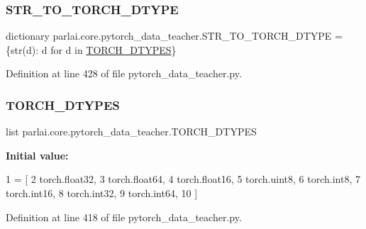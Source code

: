 \subsubsection{\texorpdfstring{S\+T\+R\+\_\+\+T\+O\+\_\+\+T\+O\+R\+C\+H\+\_\+\+D\+T\+Y\+PE}{STR\_TO\_TORCH\_DTYPE}}
{\footnotesize\ttfamily dictionary parlai.\+core.\+pytorch\+\_\+data\+\_\+teacher.\+S\+T\+R\+\_\+\+T\+O\+\_\+\+T\+O\+R\+C\+H\+\_\+\+D\+T\+Y\+PE = \{str(d)\+: d for d in \hyperlink{namespaceparlai_1_1core_1_1pytorch__data__teacher_a70d3594b63522c1d2596bd15f1fb89e0}{T\+O\+R\+C\+H\+\_\+\+D\+T\+Y\+P\+ES}\}}



Definition at line 428 of file pytorch\+\_\+data\+\_\+teacher.\+py.

\mbox{\label{namespaceparlai_1_1core_1_1pytorch__data__teacher_a70d3594b63522c1d2596bd15f1fb89e0}} 
\subsubsection{\texorpdfstring{T\+O\+R\+C\+H\+\_\+\+D\+T\+Y\+P\+ES}{TORCH\_DTYPES}}
{\footnotesize\ttfamily list parlai.\+core.\+pytorch\+\_\+data\+\_\+teacher.\+T\+O\+R\+C\+H\+\_\+\+D\+T\+Y\+P\+ES}

{\bfseries Initial value\+:}
\begin{DoxyCode}
1 =  [
2     torch.float32,
3     torch.float64,
4     torch.float16,
5     torch.uint8,
6     torch.int8,
7     torch.int16,
8     torch.int32,
9     torch.int64,
10 ]
\end{DoxyCode}


Definition at line 418 of file pytorch\+\_\+data\+\_\+teacher.\+py.

